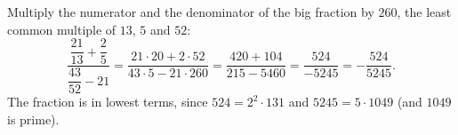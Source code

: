 Multiply the numerator and the denominator of the big fraction by $260$, the least common multiple of $13$, $5$ and $52$:
\[
\dfrac{\dfrac{21}{13}+\dfrac{2}{5}}{\dfrac{43}{52}-21}=\dfrac{21\cdot20+2\cdot52}{43\cdot5-21\cdot260}=\dfrac{420+104}{215-5460}=\dfrac{524}{-5245}=\boxed{-\dfrac{524}{5245}}.
\]
The fraction is in lowest terms, since $524=2^2\cdot131$ and $5245=5\cdot1049$ (and $1049$ is prime).
